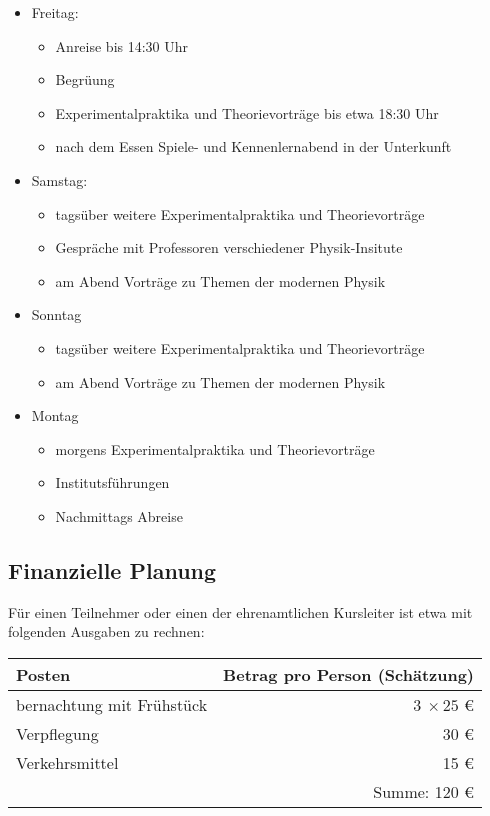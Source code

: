\documentclass[DIV13,11pt,a4paper,headinclude]{scrartcl}
\begin{document}
\begin{itemize}
\item Freitag: 
	\begin{itemize}
	\item Anreise bis 14:30 Uhr
	\item Begr\"uung
	\item Experimentalpraktika und Theorievortr\"age bis etwa 18:30 Uhr
	\item nach dem Essen Spiele- und Kennenlernabend in der Unterkunft
	\end{itemize}
\item Samstag:
	\begin{itemize}
	\item tags\"uber weitere Experimentalpraktika und Theorievortr\"age
	\item Gespr\"ache mit Professoren verschiedener Physik-Insitute
	\item am Abend Vortr\"age zu Themen der modernen Physik
	\end{itemize}
\item Sonntag
	\begin{itemize}
	\item tags\"uber weitere Experimentalpraktika und Theorievortr\"age
	\item am Abend Vortr\"age zu Themen der modernen Physik
	\end{itemize}
\item Montag
	\begin{itemize}
	\item morgens Experimentalpraktika und Theorievortr\"age
	\item Institutsf\"uhrungen
	\item Nachmittags Abreise
	\end{itemize}	
\end{itemize}

\subsection*{Finanzielle Planung}

F\"ur einen Teilnehmer oder einen der ehrenamtlichen Kursleiter ist etwa mit folgenden Ausgaben zu rechnen:

{%
\begin{center}
\begin{tabular}{|l|r|}
\hline
Posten & Betrag pro Person (Sch\"atzung)\\
\hline\hline
bernachtung mit Fr\"uhst\"uck & $3\:\times 25$ \euro \\\hline
Verpflegung & 30 \euro \\\hline
Verkehrsmittel & 15 \euro \\\hline \hline
& Summe: 120 \euro \\ \hline
\end{tabular}
\end{center}}
\end{document}
